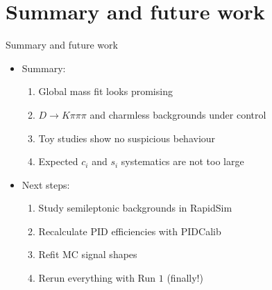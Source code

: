 \documentclass{beamer}
\begin{document}
\section{Summary and future work}
\begin{frame}{Summary and future work}
  \begin{itemize}
    \item{Summary:}
    \begin{enumerate}
      \setlength\itemsep{1.3em}
      \item{Global mass fit looks promising}
      \item{$D\to K\pi\pi\pi$ and charmless backgrounds under control}
      \item{Toy studies show no suspicious behaviour}
      \item{Expected $c_i$ and $s_i$ systematics are not too large}
    \end{enumerate}
    \item{Next steps:}
    \begin{enumerate}
      \setlength\itemsep{1.3em}
      \item{Study semileptonic backgrounds in RapidSim}
      \item{Recalculate PID efficiencies with PIDCalib}
      \item{Refit MC signal shapes}
      \item{Rerun everything with Run $1$ (finally!)}
    \end{enumerate}
  \end{itemize}
\end{frame}
\end{document}
